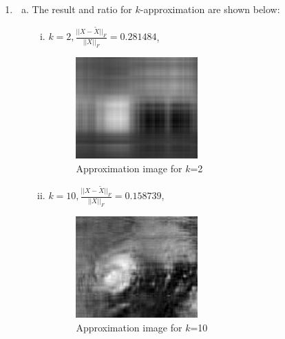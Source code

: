 \documentclass[12pt]{article}
\begin{document}
\begin{enumerate}[1)]
\begin{enumerate}[(a)]
\begin{proof}[Solution]
                When $A$ is positive definite, $f$ is strictly convex.
            \end{proof}
    \end{enumerate}
    \item 
    \begin{enumerate}[(a)]
    	\item The result and ratio for $k$-approximation are shown below:
        \begin{enumerate}[(i)]
        	\item $k = 2, \frac{||X - \tilde{X}||_{F}}{||X||_{F}}=0.281484$,
   \begin{figure}[H] %
  \centering
  \includegraphics[width=0.5\textwidth]{2_app}
  \caption{Approximation image for $k$=2}
\end{figure}

        	\item $k = 10, \frac{||X - \tilde{X}||_{F}}{||X||_{F}}=0.158739$,
   \begin{figure}[H] %
  \centering
  \includegraphics[width=0.5\textwidth]{10_app}
  \caption{Approximation image for $k$=10}
\end{figure}


\end{enumerate}
\end{enumerate}
\end{enumerate}
\end{document}
